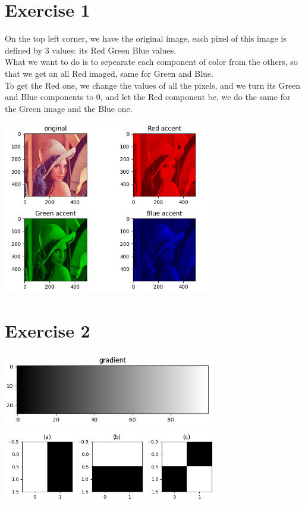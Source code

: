 \documentclass[a4paper]{article}
\begin{document}
\section*{Exercise 1}
On the top left corner, we have the original image, each pixel of this image is defined by 3 values: its Red Green Blue values.\\
What we want to do is to sepearate each component of color from the others, so that we get an all Red imaged, same for Green and Blue.\\
To get the Red one, we change the values of all the pixels, and we turn its Green and Blue components to 0, and let the Red component be, we do the same for the Green image and the Blue one.\\
\begin{center}
\includegraphics[width=0.7\textwidth]{images/exercice_1.PNG}\\[1cm] 
\end{center}

\section*{Exercise 2}
\begin{center}
\includegraphics[width=0.7\textwidth]{images/exercice_2(a).PNG}\\[1cm] 
\includegraphics[width=0.7\textwidth]{images/exercice_2(b).PNG}\\[1cm] 
\end{center}
\end{document}
